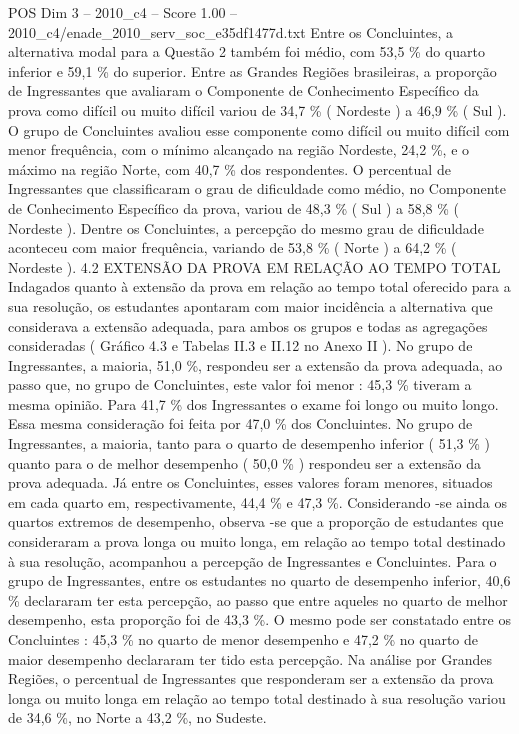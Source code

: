 \begin{textsample}{POS Dim 3 – 2010\_c4 – Score 1.00 – 2010\_c4/enade\_2010\_serv\_soc\_e35df1477d.txt}
Entre os Concluintes, a alternativa modal para a Questão 2 também foi médio, com 53,5 \% do quarto inferior e 59,1 \% do superior.
Entre as Grandes Regiões brasileiras, a proporção de Ingressantes que avaliaram o Componente de Conhecimento Específico da prova como difícil ou muito difícil variou de 34,7 \% ( Nordeste ) a 46,9 \% ( Sul ).
O grupo de Concluintes avaliou esse componente como difícil ou muito difícil com menor frequência, com o mínimo alcançado na região Nordeste, 24,2 \%, e o máximo na região Norte, com 40,7 \% dos respondentes.
O percentual de Ingressantes que classificaram o grau de dificuldade como médio, no Componente de Conhecimento Específico da prova, variou de 48,3 \% ( Sul ) a 58,8 \% ( Nordeste ).
Dentre os Concluintes, a percepção do mesmo grau de dificuldade aconteceu com maior frequência, variando de 53,8 \% ( Norte ) a 64,2 \% ( Nordeste ). 4.2 EXTENSÃO DA PROVA EM RELAÇÃO AO TEMPO TOTAL Indagados quanto à extensão da prova em relação ao tempo total oferecido para a sua resolução, os estudantes apontaram com maior incidência a alternativa que considerava a extensão adequada, para ambos os grupos e todas as agregações consideradas ( Gráfico 4.3 e Tabelas II.3 e II.12 no Anexo II ).
No grupo de Ingressantes, a maioria, 51,0 \%, respondeu ser a extensão da prova adequada, ao passo que, no grupo de Concluintes, este valor foi menor : 45,3 \% tiveram a mesma opinião.
Para 41,7 \% dos Ingressantes o exame foi longo ou muito longo.
Essa mesma consideração foi feita por 47,0 \% dos Concluintes.
No grupo de Ingressantes, a maioria, tanto para o quarto de desempenho inferior ( 51,3 \% ) quanto para o de melhor desempenho ( 50,0 \% ) respondeu ser a extensão da prova adequada.
Já entre os Concluintes, esses valores foram menores, situados em cada quarto em, respectivamente, 44,4 \% e 47,3 \%.
Considerando -se ainda os quartos extremos de desempenho, observa -se que a proporção de estudantes que consideraram a prova longa ou muito longa, em relação ao tempo total destinado à sua resolução, acompanhou a percepção de Ingressantes e Concluintes.
Para o grupo de Ingressantes, entre os estudantes no quarto de desempenho inferior, 40,6 \% declararam ter esta percepção, ao passo que entre aqueles no quarto de melhor desempenho, esta proporção foi de 43,3 \%.
O mesmo pode ser constatado entre os Concluintes : 45,3 \% no quarto de menor desempenho e 47,2 \% no quarto de maior desempenho declararam ter tido esta percepção.
Na análise por Grandes Regiões, o percentual de Ingressantes que responderam ser a extensão da prova longa ou muito longa em relação ao tempo total destinado à sua resolução variou de 34,6 \%, no Norte a 43,2 \%, no Sudeste.

\end{textsample}
